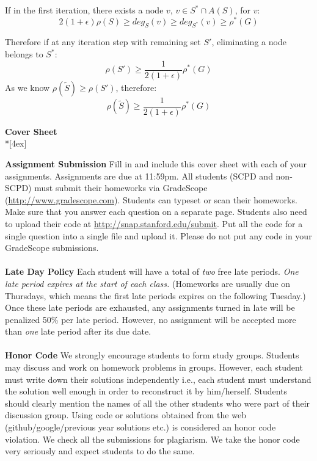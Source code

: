\documentclass[11pt]{article}
\begin{document}
If in the first iteration, there exists a node $v$, $v\in S^{*}\cap A(S)$, for $v$:
$$
2(1+\epsilon)\rho(S) \geq deg_{S}(v) \geq deg_{S^*}(v) \geq \rho^{*}(G)
$$

Therefore if at any iteration step with remaining set $S'$, eliminating a node belongs to $S^{*}$:
$$
\rho(S') \geq \frac{1}{2(1+\epsilon)}\rho^{*}(G)
$$
As we know $\rho(\tilde{S}) \geq \rho(S')$, therefore:
\begin{equation}
    \rho(\tilde{S}) \geq \frac{1}{2(1+\epsilon)}\rho^{*}(G)
\end{equation}

\pagebreak[4]
\begin{center}
\LARGE{\bf \textsf{Cover Sheet}} \\*[4ex]
\end{center}

\textbf{Assignment Submission } Fill in and include this cover sheet with each of your assignments. Assignments are due at 11:59pm. All students (SCPD and non-SCPD) must submit their homeworks via GradeScope (\url{http://www.gradescope.com}). Students can typeset or scan their homeworks. Make sure that you answer each question on a separate page. Students also need to upload their code at \url{http://snap.stanford.edu/submit}. Put all the code for a single question into a single file and upload it. Please do not put any code in your GradeScope submissions.
\\
\\
\textbf{Late Day Policy } Each student will have a total of {\em two} free late periods. {\em One late period expires at the start of each class.} (Homeworks are usually due on Thursdays, which means the first late periods expires on the following Tuesday.) Once these late periods are exhausted, any assignments turned in late will be penalized 50\% per late period. However, no assignment will be accepted more than {\em one} late period after its due date.
\\
\\
\textbf{Honor Code } We strongly encourage students to form study groups. Students may discuss and work on homework problems in groups. However, each student must write down their solutions independently i.e., each student must understand the solution well enough in order to reconstruct it by him/herself.  Students should clearly mention the names of all the other students who were part of their discussion group. Using code or solutions obtained from the web (github/google/previous year solutions etc.) is considered an honor code violation. We check all the submissions for plagiarism. We take the honor code very seriously and expect students to do the same.
\end{document}

